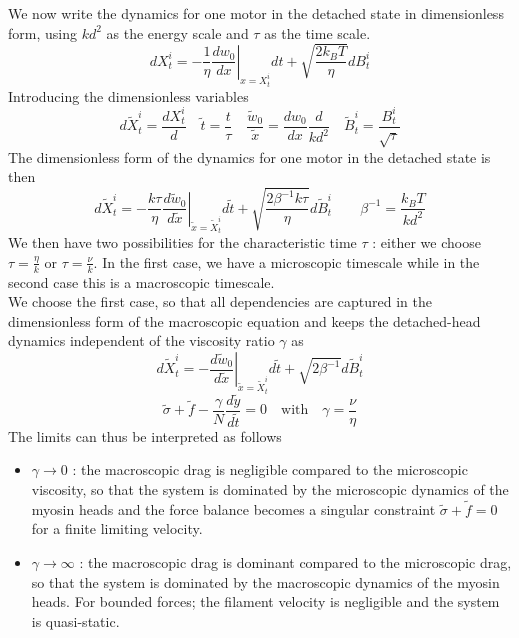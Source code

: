 \documentclass{article}
\begin{document}
We now write the dynamics for one motor in the detached state in dimensionless form, using $kd^2$ as the energy scale and $\tau$ as the time scale.
\begin{equation}
    dX_t^i = - \frac{1}{\eta}\left. \frac{dw_0}{dx} \right|_{x = X_t^i} dt + \sqrt{\frac{2k_B T}{\eta}} dB_t^i
\end{equation}
Introducing the dimensionless variables 
\begin{equation}
    d\tilde{X}_t^i = \frac{dX_t^i}{d} \quad \tilde{t} = \frac{t}{\tau} \quad \frac{\tilde{w}_0}{\tilde{x}} = \frac{dw_0}{dx}\frac{d}{kd^2} \quad \tilde{B}_t^i = \frac{B_t^i}{\sqrt{\tau}}
\end{equation}
The dimensionless form of the dynamics for one motor in the detached state is then
\begin{equation}
d\tilde{X}_t^i = - \frac{k\tau}{\eta}\left. \frac{d\tilde{w}_0}{d\tilde{x}} \right|_{\tilde{x} = \tilde{X}_t^i} d\tilde{t} + \sqrt{\frac{2\beta^{-1} k\tau}{\eta}} d\tilde{B}_t^i \qquad \beta^{-1} = \frac{k_B T}{k d^2}
\end{equation}
We then have two possibilities for the characteristic time $\tau$ : either we choose $\tau = \frac{\eta}{k}$ or $\tau = \frac{\nu}{k}$. In the first case, we have a microscopic timescale while in the second case this is a macroscopic timescale.\\
We choose the first case, so that all dependencies are captured in the dimensionless form of the macroscopic equation and keeps the detached-head dynamics independent of the viscosity ratio $\gamma$ as 
\begin{equation}
    d\tilde{X}_t^i = - \left. \frac{d\tilde{w}_0}{d\tilde{x}} \right|_{\tilde{x} = \tilde{X}_t^i} d\tilde{t} + \sqrt{2\beta^{-1}} d\tilde{B}_t^i
\end{equation}
\begin{equation}
    \tilde{\sigma} + \tilde{f} - \frac{\gamma}{N} \frac{d\tilde{y}}{d\tilde{t}} = 0 \quad \text{with} \quad \gamma = \frac{\nu}{\eta}
\end{equation}
The limits can thus be interpreted as follows 
\begin{itemize}
    \item $\gamma \rightarrow 0$ : the macroscopic drag is negligible compared to the microscopic viscosity, so that the system is dominated by the microscopic dynamics of the myosin heads and the force balance becomes a singular constraint $\tilde{\sigma} + \tilde{f} = 0$ for a finite limiting velocity.
    \item $\gamma \rightarrow \infty$ : the macroscopic drag is dominant compared to the microscopic drag, so that the system is dominated by the macroscopic dynamics of the myosin heads. For bounded forces; the filament velocity is negligible and the system is quasi-static.
\end{itemize}
\end{document}
